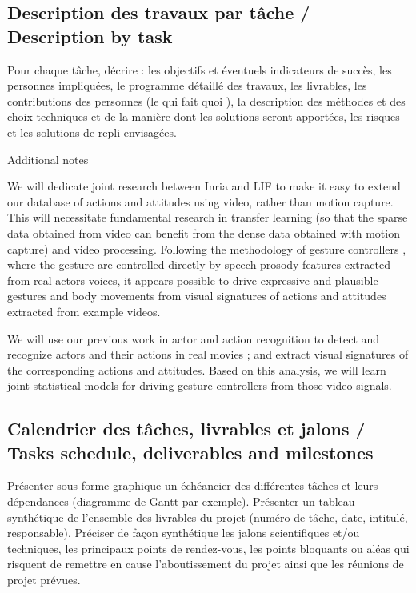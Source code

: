 
\subsection{Description des travaux par tâche / Description by task}
\begin{xcomment}  
Pour chaque tâche, d\'ecrire : 
les objectifs et \'eventuels indicateurs de succ\`es,
les personnes impliqu\'ees,
le programme d\'etaill\'e des travaux,
les livrables,
les contributions des personnes (le qui fait quoi ),
la description des m\'ethodes et des choix techniques et de la mani\`ere dont les solutions seront apport\'ees,
les risques et les solutions de repli envisag\'ees.
\end{xcomment}










Additional notes


We will dedicate joint research between Inria and LIF to make it easy to extend our database of actions and attitudes
using video, rather than motion capture. This will necessitate fundamental research in transfer learning (so that the sparse
data obtained from video can benefit from the dense data obtained with motion capture) and video processing.  Following the
methodology of  gesture controllers \cite{Levine2010}, where the gesture are controlled directly by speech prosody features
extracted from real actors voices, it appears possible to drive expressive and plausible gestures and body movements from
visual signatures of actions and attitudes extracted from example videos. 

We will use  our previous work in actor and action recognition \cite{Weinland06,Weinland07,Gandhi13} to detect and recognize
actors and their actions in real movies ; and extract visual signatures of the corresponding actions and attitudes. Based on this
analysis, we will learn joint statistical models for driving gesture controllers from those video signals.







\subsection{Calendrier des tâches, livrables et jalons / Tasks schedule, deliverables and milestones}
\begin{xcomment} 
Pr\'esenter sous forme graphique un \'ech\'eancier des diff\'erentes tâches et leurs d\'ependances (diagramme de Gantt par exemple).
Pr\'esenter un tableau synth\'etique de l'ensemble des livrables du projet (num\'ero de tâche, date, intitul\'e, responsable).
Pr\'eciser de façon synth\'etique les jalons scientifiques et/ou techniques, les principaux points de rendez-vous, les points bloquants ou al\'eas qui risquent de remettre en cause l'aboutissement du projet ainsi que les r\'eunions de projet pr\'evues.

\end{xcomment}

\endinput